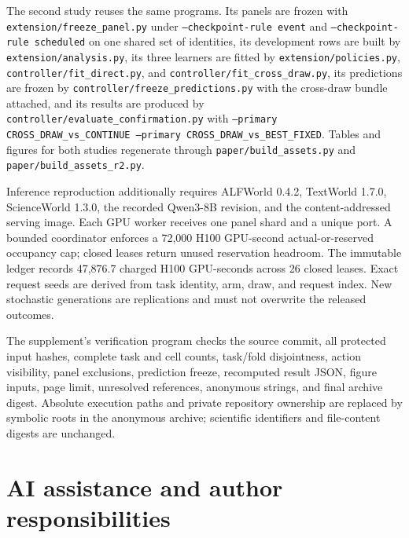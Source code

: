 The second study reuses the same programs. Its panels are frozen with \texttt{extension/freeze\_panel.py} under \texttt{--checkpoint-rule event} and \texttt{--checkpoint-rule scheduled} on one shared set of identities, its development rows are built by \texttt{extension/analysis.py}, its three learners are fitted by \texttt{extension/policies.py}, \texttt{controller/fit\_direct.py}, and \texttt{controller/fit\_cross\_draw.py}, its predictions are frozen by \texttt{controller/freeze\_predictions.py} with the cross-draw bundle attached, and its results are produced by \texttt{controller/evaluate\_confirmation.py} with \texttt{--primary CROSS\_DRAW\_vs\_CONTINUE --primary CROSS\_DRAW\_vs\_BEST\_FIXED}. Tables and figures for both studies regenerate through \texttt{paper/build\_assets.py} and \texttt{paper/build\_assets\_r2.py}.

Inference reproduction additionally requires ALFWorld 0.4.2, TextWorld 1.7.0, ScienceWorld 1.3.0, the recorded Qwen3-8B revision, and the content-addressed serving image. Each GPU worker receives one panel shard and a unique port. A bounded coordinator enforces a 72,000 H100 GPU-second actual-or-reserved occupancy cap; closed leases return unused reservation headroom. The immutable ledger records 47,876.7 charged H100 GPU-seconds across 26 closed leases. Exact request seeds are derived from task identity, arm, draw, and request index. New stochastic generations are replications and must not overwrite the released outcomes.

The supplement's verification program checks the source commit, all protected input hashes, complete task and cell counts, task/fold disjointness, action visibility, panel exclusions, prediction freeze, recomputed result JSON, figure inputs, page limit, unresolved references, anonymous strings, and final archive digest. Absolute execution paths and private repository ownership are replaced by symbolic roots in the anonymous archive; scientific identifiers and file-content digests are unchanged.

\section{AI assistance and author responsibilities}
\label{app:ai}

